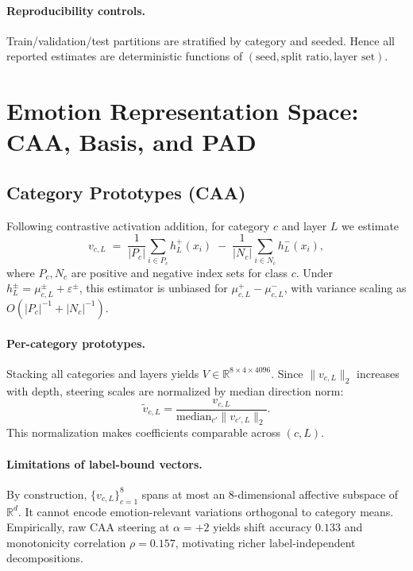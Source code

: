 \paragraph{Reproducibility controls.}
\label{sec:dev:activations:repro}
Train/validation/test partitions are stratified by category and seeded.
Hence all reported estimates are deterministic functions of
$(\text{seed},\text{split ratio},\text{layer set})$.

\section{Emotion Representation Space: CAA, Basis, and PAD}
\label{sec:dev:caa}

\subsection{Category Prototypes (CAA)}
\label{sec:dev:caa:formula}
Following contrastive activation addition, for category $c$ and layer
$L$ we estimate
\begin{equation}
\label{eq:caa}
  v_{c, L} \;=\; \frac{1}{|P_c|} \sum_{i \in P_c} h_L^{+}(x_i)
            \; -\; \frac{1}{|N_c|} \sum_{i \in N_c} h_L^{-}(x_i),
\end{equation}
where $P_c,N_c$ are positive and negative index sets for class $c$.
Under $h_L^{\pm}=\mu_{c,L}^{\pm}+\varepsilon^{\pm}$, this estimator is
unbiased for $\mu_{c,L}^+-\mu_{c,L}^-$, with variance scaling as
$O(|P_c|^{-1}+|N_c|^{-1})$.

\paragraph{Per-category prototypes.}
\label{sec:dev:caa:tensor}
Stacking all categories and layers yields
$V\in\mathbb{R}^{8\times 4\times 4096}$. Since
$\|v_{c,L}\|_2$ increases with depth, steering scales are normalized by
median direction norm:
\begin{equation}
  \tilde{v}_{c,L}=\frac{v_{c,L}}{\mathrm{median}_{c'}\|v_{c',L}\|_2}.
\end{equation}
This normalization makes coefficients comparable across $(c,L)$.

\paragraph{Limitations of label-bound vectors.}
\label{sec:dev:caa:limits}
By construction, $\{v_{c,L}\}_{c=1}^{8}$ spans at most an
8-dimensional affective subspace of $\mathbb{R}^{d}$. It cannot encode
emotion-relevant variations orthogonal to category means. Empirically,
raw CAA steering at $\alpha=+2$ yields shift accuracy $0.133$ and
monotonicity correlation $\rho=0.157$, motivating richer
label-independent decompositions.

